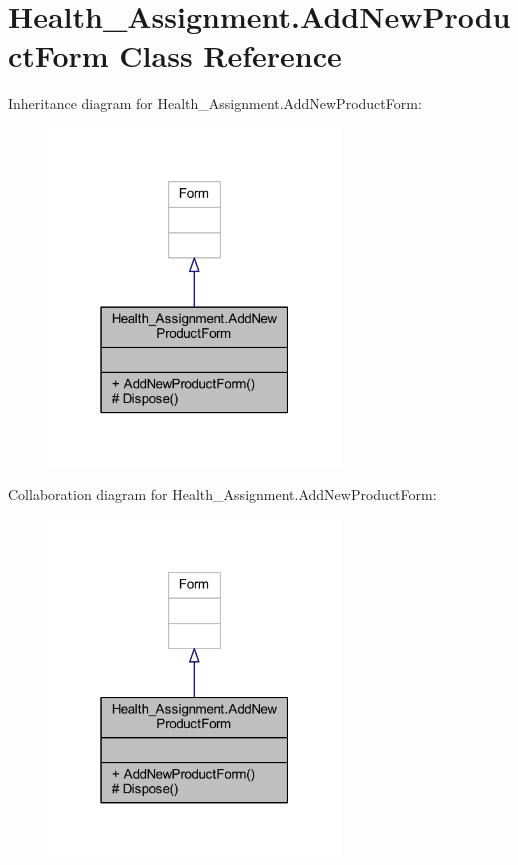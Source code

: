 \hypertarget{class_health___assignment_1_1_add_new_product_form}{}\section{Health\+\_\+\+Assignment.\+Add\+New\+Product\+Form Class Reference}
\label{class_health___assignment_1_1_add_new_product_form}


Inheritance diagram for Health\+\_\+\+Assignment.\+Add\+New\+Product\+Form\+:\nopagebreak
\begin{figure}[H]
\begin{center}
\leavevmode
\includegraphics[width=220pt]{class_health___assignment_1_1_add_new_product_form__inherit__graph}
\end{center}
\end{figure}


Collaboration diagram for Health\+\_\+\+Assignment.\+Add\+New\+Product\+Form\+:\nopagebreak
\begin{figure}[H]
\begin{center}
\leavevmode
\includegraphics[width=220pt]{class_health___assignment_1_1_add_new_product_form__coll__graph}
\end{center}
\end{figure}
